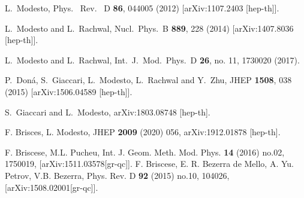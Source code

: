 \documentclass[a4paper,11pt]{article}
\begin{document}
\begin{thebibliography}{99}

L.~Modesto,
Phys. \ Rev. \ D {\bf 86}, 044005 (2012)
[arXiv:1107.2403 [hep-th]].


L.~Modesto and L.~Rachwal,
Nucl.\ Phys.\ B {\bf 889}, 228 (2014)
[arXiv:1407.8036 [hep-th]].

L.~Modesto and L.~Rachwal,
Int.\ J.\ Mod.\ Phys.\ D {\bf 26}, no. 11, 1730020 (2017).








P.~Don\'a, S.~Giaccari, L.~Modesto, L.~Rachwal and Y.~Zhu,
JHEP {\bf 1508}, 038 (2015)
[arXiv:1506.04589 [hep-th]].





S.~Giaccari and L.~Modesto,
arXiv:1803.08748 [hep-th]. 




 F. Brisces, L. Modesto, JHEP {\bf 2009} (2020) 056, arXiv:1912.01878 [hep-th].










F. Briscese, M.L. Pucheu,  Int. J. Geom. Meth. Mod. Phys. {\bf14} (2016) no.02, 1750019, [arXiv:1511.03578[gr-qc]].
F. Briscese, E. R. Bezerra de Mello, A. Yu. Petrov, V.B. Bezerra, Phys. Rev. D {\bf 92} (2015) no.10, 104026, [arXiv:1508.02001[gr-qc]].




\end{thebibliography}
\end{document}

